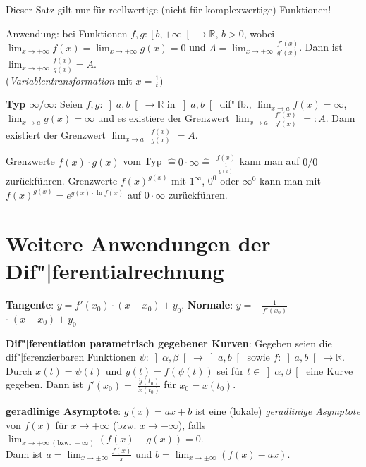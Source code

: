 Dieser Satz gilt nur für reellwertige (nicht für komplexwertige) Funktionen!

Anwendung: bei Funktionen
$f, g: \left[b,+\infty\right[ \rightarrow \mathbb{R}$, $b > 0$,
wobei \\
$\lim_{x \to +\infty} f(x) = \lim_{x \to +\infty} g(x) = 0$ und
$A = \lim_{x \to +\infty} \frac{f'(x)}{g'(x)}$.
Dann ist $\lim_{x \to +\infty} \frac{f(x)}{g(x)} = A$. \\
(\emph{Variablentransformation} mit $x = \frac{1}{t}$)

\linie

\textbf{Typ $\infty/\infty$}:
Seien $f, g: \left]a,b\right[ \rightarrow \mathbb{R}$ in $\left]a,b\right[$
dif"|fb., $\lim_{x \to a} f(x) = \infty$, $\lim_{x \to a} g(x) = \infty$
und es existiere der Grenzwert $\lim_{x \to a}$%
{\large $\frac{f'(x)}{g'(x)}$} $=: A$. \qquad
Dann existiert der Grenzwert $\lim_{x \to a}$%
{\large $\frac{f(x)}{g(x)}$} $= A$.

Grenzwerte $f(x) \cdot g(x)$ vom Typ $\mathrel{\widehat{=}} 0 \cdot \infty
\mathrel{\widehat{=}}$ {\large $\frac{f(x)}{\frac{1}{g(x)}}$} kann man auf
$0/0$ zurückführen.
Grenzwerte $f(x)^{g(x)}$ mit $1^\infty$, $0^0$ oder $\infty^0$ kann man
mit $f(x)^{g(x)} = e^{g(x) \cdot \ln f(x)}$ auf $0 \cdot \infty$ zurückführen.

\section{%
    Weitere Anwendungen der Dif"|ferentialrechnung%
}

\textbf{Tangente}: $y = f'(x_0) \cdot (x - x_0) + y_0$, \qquad
\textbf{Normale}: $y = -${\large $\frac{1}{f'(x_0)}$} $\cdot\; (x - x_0) + y_0$

\textbf{Dif"|ferentiation parametrisch gegebener Kurven}:
Gegeben seien die dif"|ferenzierbaren Funktionen
$\psi: \left]\alpha,\beta\right[ \rightarrow \left]a,b\right[$ sowie
$f: \left]a,b\right[ \rightarrow \mathbb{R}$.
Durch $x(t) = \psi(t)$ und $y(t) = f(\psi(t))$ sei für
$t \in \left]\alpha, \beta\right[$ eine Kurve gegeben.
Dann ist $f'(x_0) =$ {\large $\frac{\dot{y}(t_0)}{\dot{x}(t_0)}$}
für $x_0 = x(t_0)$.

\textbf{geradlinige Asymptote}:
$g(x) = ax + b$ ist eine (lokale) \emph{geradlinige Asymptote} von $f(x)$ für
$x \to +\infty$ (bzw. $x \to -\infty$), falls
$\lim_{x \to +\infty\; (\text{bzw. }-\infty)} (f(x) - g(x)) = 0$. \\
Dann ist $a = \lim_{x \to \pm\infty} \frac{f(x)}{x}$ und
$b = \lim_{x \to \pm\infty} (f(x) - ax)$.

